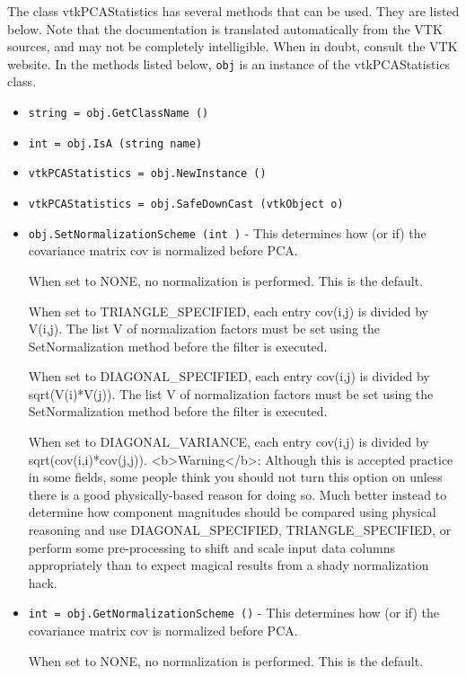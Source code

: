 The class vtkPCAStatistics has several methods that can be used.
  They are listed below.
Note that the documentation is translated automatically from the VTK sources,
and may not be completely intelligible.  When in doubt, consult the VTK website.
In the methods listed below, \verb|obj| is an instance of the vtkPCAStatistics class.
\begin{itemize}
\item  \verb|string = obj.GetClassName ()|

\item  \verb|int = obj.IsA (string name)|

\item  \verb|vtkPCAStatistics = obj.NewInstance ()|

\item  \verb|vtkPCAStatistics = obj.SafeDownCast (vtkObject o)|

\item  \verb|obj.SetNormalizationScheme (int )| -  This determines how (or if) the covariance matrix  cov is normalized before PCA.

 When set to NONE, no normalization is performed. This is the default.

 When set to TRIANGLE\_SPECIFIED, each entry cov(i,j) is divided by V(i,j).
 The list V of normalization factors must be set using the SetNormalization method
 before the filter is executed.

 When set to DIAGONAL\_SPECIFIED, each entry cov(i,j) is divided by sqrt(V(i)*V(j)).
 The list V of normalization factors must be set using the SetNormalization method
 before the filter is executed.

 When set to DIAGONAL\_VARIANCE, each entry cov(i,j) is divided by sqrt(cov(i,i)*cov(j,j)).
 <b>Warning</b>: Although this is accepted practice in some fields,
 some people think you should not turn this option on unless there
 is a good physically-based reason for doing so. Much better instead
 to determine how component magnitudes should be compared using
 physical reasoning and use DIAGONAL\_SPECIFIED, TRIANGLE\_SPECIFIED, or
 perform some pre-processing to shift and scale input data columns
 appropriately than to expect magical results from a shady normalization hack.

\item  \verb|int = obj.GetNormalizationScheme ()| -  This determines how (or if) the covariance matrix  cov is normalized before PCA.

 When set to NONE, no normalization is performed. This is the default.


\end{itemize}
